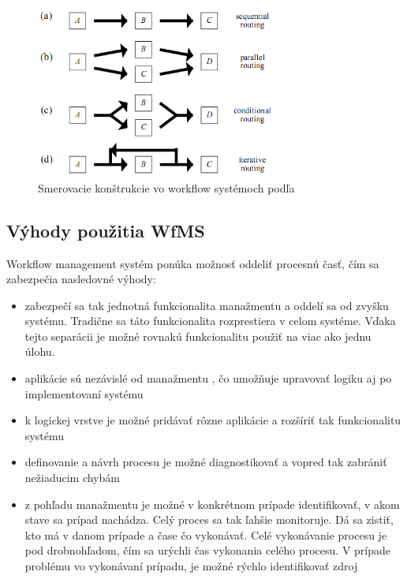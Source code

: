 \begin{figure}[h]
	\centerline{\includegraphics[width=0.7\textwidth]{images/smerovacie_konstrukcie}}
	\caption[smerovacie konštrukcie]{Smerovacie konštrukcie vo workflow systémoch podľa \cite{workflow_systemy}}
	\label{obr:cursus}
\end{figure}


\subsection{Výhody použitia WfMS}
Workflow management systém ponúka možnosť oddeliť procesnú časť, čím sa zabezpečia nasledovné výhody:
\begin{itemize}
	\item zabezpečí sa tak jednotná funkcionalita manažmentu a oddelí sa od zvyšku systému. Tradične sa táto funkcionalita rozprestiera v celom systéme. Vďaka tejto separácii je možné rovnakú funkcionalitu použiť na viac ako jednu úlohu.
	\item aplikácie sú nezávislé od manažmentu , čo umožňuje upravovať logiku aj po implementovaní systému
	\item k logickej vrstve je možné pridávať rôzne aplikácie a rozšíriť tak funkcionalitu systému
	\item definovanie a návrh procesu je možné diagnostikovať a vopred tak zabrániť nežiaducim chybám
	\item z pohľadu manažmentu je možné v konkrétnom prípade identifikovať, v akom stave sa prípad nachádza. Celý proces sa tak ľahšie monitoruje. Dá sa zistiť, kto má v danom prípade a čase čo vykonávať. Celé vykonávanie procesu je pod drobnohľadom, čím sa urýchli čas vykonania celého procesu. V prípade problému vo vykonávaní prípadu, je možné rýchlo identifikovať zdroj
	
\end{itemize}

